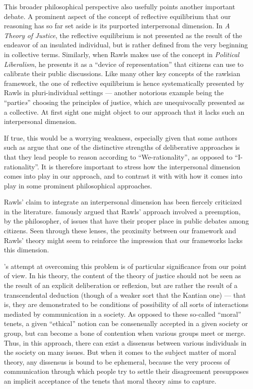 \documentclass[version=3.21, pagesize, twoside=off, bibliography=totoc, DIV=calc, fontsize=12pt, a4paper, french, english]{scrartcl}
\begin{document}
This broader philosophical perspective also usefully points another important debate. A prominent aspect of the concept of reflective equilibrium that our reasoning has so far set aside is its purported interpersonal dimension. In \emph{A Theory of Justice}, the reflective equilibrium is not presented as the result of the endeavor of an insulated individual, but is rather defined from the very beginning in collective terms. Similarly, when Rawls makes use of the concept in \emph{Political Liberalism}, he presents it as a  “device of representation” that citizens can use to calibrate their public discussions. Like many other key concepts of the rawlsian framework, the one of reflective equilibrium is hence systematically presented by Rawls in pluri-individual settings --- another notorious example being the “partie\emph{s}”  choosing the principles of justice, which are unequivocally presented as a collective. At first sight one might object to our approach that it lacks such an interpersonal dimension.

If true, this would be a worrying weakness, especially given that some authors such as \citet{vatn_institutional_2009} argue that one of the distinctive strengths of deliberative approaches is that they lead people to reason according to ``We-rationality'', as opposed to ``I-rationality''. It is therefore important to stress how the interpersonal dimension comes into play in our approach, and to contrast it with with how it comes into play in some prominent philosophical approaches.

Rawls' claim to integrate an interpersonal dimension has been fiercely criticized in the literature. \citet{habermas_short_1999} famously argued that Rawls' approach involved a preemption, by the philosopher, of issues that have their proper place in public debates among citizens. Seen through these lenses, the proximity between our framework and Rawls' theory might seem to reinforce the impression that our frameworks lacks this dimension.

\citeauthor{habermas_moralbewustsein_1983}'s \citeyearpar{habermas_moralbewustsein_1983} attempt at overcoming this problem is of particular significance from our point of view. In his theory, the content of the theory of justice should not be seen as the result of an explicit deliberation or reflexion, but are rather the result of a transcendental deduction (though of a weaker sort that the Kantian one) --- that is, they are demonstrated to be conditions of possibility of all sorts of interactions mediated by communication in a society. As opposed to these so-called “moral” tenets, a given “ethical” notion can be consensually accepted in a given society or group, but can become a bone of contention when various groups meet or merge. Thus, in this approach, there can exist a dissensus between various individuals in the society on many issues. But when it comes to the subject matter of moral theory, any dissensus is bound to be ephemeral, because the very process of communication through which people try to settle their disagreement presupposes an implicit acceptance of the tenets that moral theory aims to capture.
\end{document}
